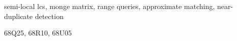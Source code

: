 \documentclass[review,onefignum,onetabnum]{siamart190516}
\begin{document}
\maketitle



\begin{keywords}
  semi-local lcs, monge matrix, range queries, approximate matching, near-duplicate detection
\end{keywords}

\begin{AMS}
  68Q25, 68R10, 68U05
\end{AMS}





%






\end{document}
